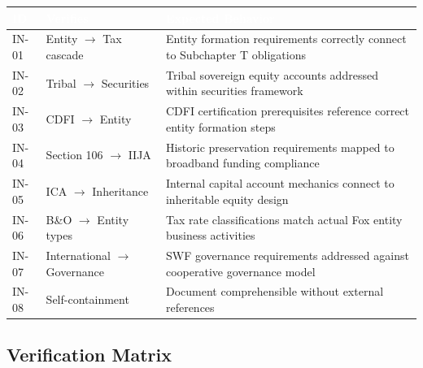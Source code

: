 \documentclass[11pt,letterpaper]{article}
\newcommand{\tableheader}[1]{\textbf{\sffamily\textcolor{white}{#1}}}
\begin{document}
\begin{center}
\begin{tabularx}{\textwidth}{C{1.2cm}L{3cm}X}
\toprule
{}
\tableheader{ID} & \tableheader{Verifies} & \tableheader{Expected Behavior} \\
\midrule
IN-01 & Entity $\rightarrow$ Tax cascade & Entity formation requirements correctly connect to Subchapter T obligations \\
IN-02 & Tribal $\rightarrow$ Securities & Tribal sovereign equity accounts addressed within securities framework \\
IN-03 & CDFI $\rightarrow$ Entity & CDFI certification prerequisites reference correct entity formation steps \\
IN-04 & Section 106 $\rightarrow$ IIJA & Historic preservation requirements mapped to broadband funding compliance \\
IN-05 & ICA $\rightarrow$ Inheritance & Internal capital account mechanics connect to inheritable equity design \\
IN-06 & B\&O $\rightarrow$ Entity types & Tax rate classifications match actual Fox entity business activities \\
IN-07 & International $\rightarrow$ Governance & SWF governance requirements addressed against cooperative governance model \\
IN-08 & Self-containment & Document comprehensible without external references \\
\bottomrule
\end{tabularx}
\end{center}

\subsection{Verification Matrix}
\end{document}
